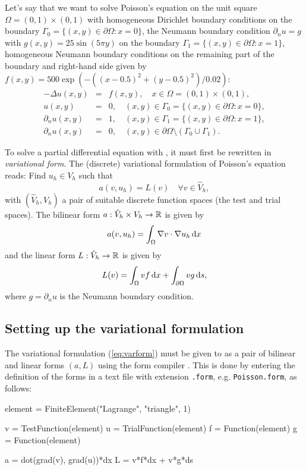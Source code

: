 Let's say that we want to solve Poisson's equation on the unit square
$\Omega = (0,1) \times (0,1)$ with homogeneous Dirichlet boundary
conditions on the boundary $\Gamma_0 = \{(x, y) \in \partial \Omega : x = 0\}$,
the Neumann boundary condition $\partial_n u = g$ 
with $g(x, y) = 25 \sin(5\pi y)$
on the boundary $\Gamma_1 = \{(x, y) \in \partial \Omega : x = 1\}$,
homogeneous Neumann boundary conditions on the remaining part of the boundary
and right-hand side given by $f(x, y) = 500 \exp(-((x-0.5)^2 +
(y-0.5)^2)/0.02)$:
\begin{eqnarray} \label{eq:poisson,quickstart}
  - \Delta u(x, y) &=& f(x, y), \quad
  x \in \Omega = (0,1) \times (0,1), \\
  u(x, y) &=& 0, \quad
  (x, y) \in \Gamma_0 = \{(x, y) \in \partial \Omega : x = 0\}, \\
  \partial_n u(x, y) &=& 1, \quad
  (x, y) \in \Gamma_1 = \{(x, y) \in \partial \Omega : x = 1\}, \\
  \partial_n u(x, y) &=& 0, \quad
  (x, y) \in \partial \Omega \setminus (\Gamma_0 \cup \Gamma_1).
\end{eqnarray}

To solve a partial differential equation with \dolfin{}, it must first
be rewritten in \emph{variational form}.  The (discrete) variational
formulation of Poisson's equation reads: Find $u_h \in V_h$ such that
\begin{equation} \label{eq:varform}
  a(v, u_h) = L(v) \quad \forall v\in \hat{V}_h, 
\end{equation}
with $(\hat{V}_h, V_h)$ a pair of suitable discrete function spaces
(the test and trial spaces). The bilinear form $a : \hat{V}_h \times V_h
\rightarrow \mathbb{R}$ is given by
\begin{equation}
  a(v, u_h) = \int_{\Omega} \nabla v \cdot \nabla u_h \, \mathrm{d}x
\end{equation}
and the linear form $L : \hat{V}_h \rightarrow \mathbb{R}$ is given by
\begin{equation}
  L(v) = \int_{\Omega} v f \, \mathrm{d}x + \int_{\partial \Omega} v g \, \mathrm{d}s,
\end{equation}
where $g = \partial_n u$ is the Neumann boundary condition.

\subsection{Setting up the variational formulation}

The variational formulation (\ref{eq:varform}) must be given to
\dolfin{} as a pair of bilinear and linear forms $(a, L)$ using the
form compiler \ffc{}. This is done by entering the definition of
the forms in a text file with extension \texttt{.form},
e.g. \texttt{Poisson.form}, as follows:
\begin{code}
element = FiniteElement("Lagrange", "triangle", 1)

v = TestFunction(element)
u = TrialFunction(element)
f = Function(element)
g = Function(element)

a = dot(grad(v), grad(u))*dx
L = v*f*dx + v*g*ds
\end{code}

